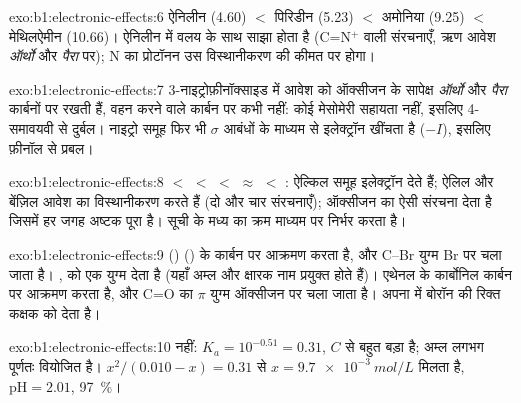 \begin{solution}{exo:b1:electronic-effects:6}
ऐनिलीन (4.60) $<$ पिरिडीन (5.23) $<$ अमोनिया (9.25) $<$ मेथिलऐमीन
(10.66)। ऐनिलीन में  वलय के साथ साझा होता है
(C=N$^+$ वाली संरचनाएँ, ऋण आवेश \textit{ऑर्थो} और
\textit{पैरा} पर); N का प्रोटॉनन उस विस्थानीकरण की कीमत पर होगा।
\end{solution}

\begin{solution}{exo:b1:electronic-effects:7}
3-नाइट्रोफ़ीनॉक्साइड में  आवेश को ऑक्सीजन के सापेक्ष
\textit{ऑर्थो} और \textit{पैरा} कार्बनों पर रखती हैं,  वहन करने वाले कार्बन
पर कभी नहीं: कोई मेसोमेरी सहायता नहीं, इसलिए 4-समावयवी से दुर्बल।
नाइट्रो समूह फिर भी $\sigma$ आबंधों के माध्यम से इलेक्ट्रॉन खींचता है ($-I$),
इसलिए फ़ीनॉल से प्रबल।
\end{solution}

\begin{solution}{exo:b1:electronic-effects:8}
 $<$  $<$  $<$ 
$\approx$  $<$ : ऐल्किल समूह इलेक्ट्रॉन देते हैं;
ऐलिल और बेंज़िल आवेश का विस्थानीकरण करते हैं (दो और चार संरचनाएँ);
ऑक्सीजन का  ऐसी संरचना देता है जिसमें हर जगह अष्टक पूरा है। सूची के
मध्य का क्रम माध्यम पर निर्भर करता है।
\end{solution}

\begin{solution}{exo:b1:electronic-effects:9}
 ()  () के कार्बन पर आक्रमण करता है,
और C--Br युग्म Br पर चला जाता है। ,  को एक युग्म देता है (यहाँ अम्ल
और क्षारक नाम प्रयुक्त होते हैं)।  एथेनल के कार्बोनिल कार्बन पर आक्रमण करता है,
और C=O का $\pi$ युग्म ऑक्सीजन पर चला जाता है।  अपना 
 में बोरॉन की रिक्त कक्षक को देता है।
\end{solution}

\begin{solution}{exo:b1:electronic-effects:10}
नहीं: $K_a = 10^{-0.51} = 0.31$, $C$ से बहुत बड़ा है; अम्ल लगभग
पूर्णतः वियोजित है। $x^2/(0.010 - x) = 0.31$ से $x = \qty{9.7e-3}{mol/L}$ मिलता है,
$\mathrm{pH} = 2.01$,  \qty{97}{\percent}।
\end{solution}

